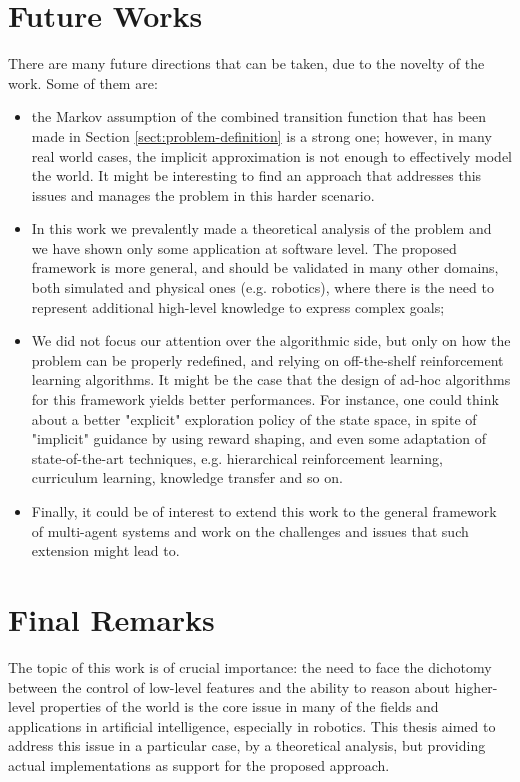 \section{Future Works}
There are many future directions that can be taken, due to the novelty of the work. Some of them are:
\begin{itemize}
	\item the Markov assumption of the combined transition function that has been made in Section \ref{sect:problem-definition} is a strong one; however, in many real world cases, the implicit approximation is not enough to effectively model the world. It might be interesting to find an approach that addresses this issues and manages the problem in this harder scenario.
	\item In this work we prevalently made a theoretical analysis of the problem and we have shown only some application at software level. The proposed framework is more general, and should be validated in many other domains, both simulated and physical ones (e.g. robotics), where there is the need to represent additional high-level knowledge to express complex goals;
	\item We did not focus our attention over the algorithmic side, but only on how the problem can be properly redefined, and relying on off-the-shelf reinforcement learning algorithms. It might be the case that the design of ad-hoc algorithms for this framework yields better performances. For instance, one could think about a better "explicit" exploration policy of the state space, in spite of "implicit" guidance by using reward shaping, and even some adaptation of state-of-the-art techniques, e.g. hierarchical reinforcement learning, curriculum learning, knowledge transfer and so on.
	\item Finally, it could be of interest to extend this work to the general framework of multi-agent systems and work on the challenges and issues that such extension might lead to.
\end{itemize}

\section{Final Remarks}
The topic of this work is of crucial importance: the need to face the dichotomy between the control of low-level features and the ability to reason about higher-level properties of the world is the core issue in many of the fields and applications in artificial intelligence, especially in robotics. This thesis aimed to address this issue in a particular case, by a theoretical analysis, but providing actual implementations as support for the proposed approach.